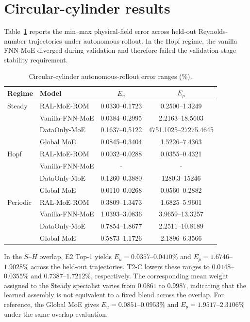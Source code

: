 \section{Circular-cylinder results}
\label{app:circular}

Table~\ref{tab:circular_full} reports the min--max physical-field error across held-out Reynolds-number trajectories under autonomous rollout. In the Hopf regime, the vanilla FNN-MoE diverged during validation and therefore failed the validation-stage stability requirement.

\begin{table}[h]
\centering
\caption{Circular-cylinder autonomous-rollout error  ranges (\%). }
\label{tab:circular_full}
\small
\setlength{\tabcolsep}{4pt}
\begin{tabular}{llcc}
\toprule
Regime & Model & $E_u$ & $E_p$ \\
\midrule
Steady & RAL-MoE-ROM & 0.0330--0.1723 & 0.2500--1.3249 \\
 & Vanilla-FNN-MoE & 0.0384--0.2995 & 2.2163--18.5603 \\
 & DataOnly-MoE & 0.1637--0.5122 & 4751.1025--27275.4645 \\
 & Global MoE & 0.0845--0.3404 & 1.5226--7.4363 \\
\midrule
Hopf & RAL-MoE-ROM & 0.0032--0.0288 & 0.0355--0.4321 \\
 & Vanilla-FNN-MoE & - & -  \\
 & DataOnly-MoE & 0.1260--0.3880 & 1280.3--15246 \\
 & Global MoE & 0.0110--0.0268 & 0.0560--0.2882 \\
\midrule
Periodic & RAL-MoE-ROM & 0.3809--1.3473 & 1.6825--5.9601 \\
 & Vanilla-FNN-MoE & 1.0393--3.0836 & 3.9659--13.3257 \\
 & DataOnly-MoE & 0.7854--1.8677 & 2.2511--10.8189 \\
 & Global MoE & 0.5873--1.1726 & 2.1896--6.3566 \\
\bottomrule
\end{tabular}
\end{table}

In the $S$--$H$ overlap, E2 Top-1 yields $E_u=0.0357$--$0.0410\%$ and
$E_p=1.6746$--$1.9028\%$ across the held-out trajectories. T2-C lowers these ranges to $0.0148$--$0.0355\%$ and $0.7387$--$1.7212\%$, respectively. The corresponding mean weight assigned to the Steady specialist varies from $0.0861$ to $0.9987$, indicating that the learned assembly is not equivalent to a fixed blend across the overlap. For reference, the Global MoE gives $E_u=0.0851$--$0.0953\%$ and $E_p=1.9517$--$2.3106\%$ under the same overlap evaluation.
